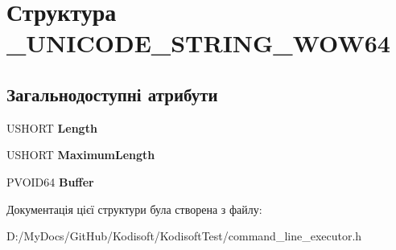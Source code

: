 \hypertarget{struct___u_n_i_c_o_d_e___s_t_r_i_n_g___w_o_w64}{\section{Структура \+\_\+\+U\+N\+I\+C\+O\+D\+E\+\_\+\+S\+T\+R\+I\+N\+G\+\_\+\+W\+O\+W64}
\label{struct___u_n_i_c_o_d_e___s_t_r_i_n_g___w_o_w64}
}
\subsection*{Загальнодоступні атрибути}
\begin{DoxyCompactItemize}
\item 
\hypertarget{struct___u_n_i_c_o_d_e___s_t_r_i_n_g___w_o_w64_a2e067b5bf10223dee38df4b9101b07f9}{U\+S\+H\+O\+R\+T {\bfseries Length}}\label{struct___u_n_i_c_o_d_e___s_t_r_i_n_g___w_o_w64_a2e067b5bf10223dee38df4b9101b07f9}

\item 
\hypertarget{struct___u_n_i_c_o_d_e___s_t_r_i_n_g___w_o_w64_a1849eeba3648f70e29b239fa9fe2ecfb}{U\+S\+H\+O\+R\+T {\bfseries Maximum\+Length}}\label{struct___u_n_i_c_o_d_e___s_t_r_i_n_g___w_o_w64_a1849eeba3648f70e29b239fa9fe2ecfb}

\item 
\hypertarget{struct___u_n_i_c_o_d_e___s_t_r_i_n_g___w_o_w64_a0ba9d9a1e2e45f02879da6b545fa0798}{P\+V\+O\+I\+D64 {\bfseries Buffer}}\label{struct___u_n_i_c_o_d_e___s_t_r_i_n_g___w_o_w64_a0ba9d9a1e2e45f02879da6b545fa0798}

\end{DoxyCompactItemize}


Документація цієї структури була створена з файлу\+:\begin{DoxyCompactItemize}
\item 
D\+:/\+My\+Docs/\+Git\+Hub/\+Kodisoft/\+Kodisoft\+Test/command\+\_\+line\+\_\+executor.\+h\end{DoxyCompactItemize}
